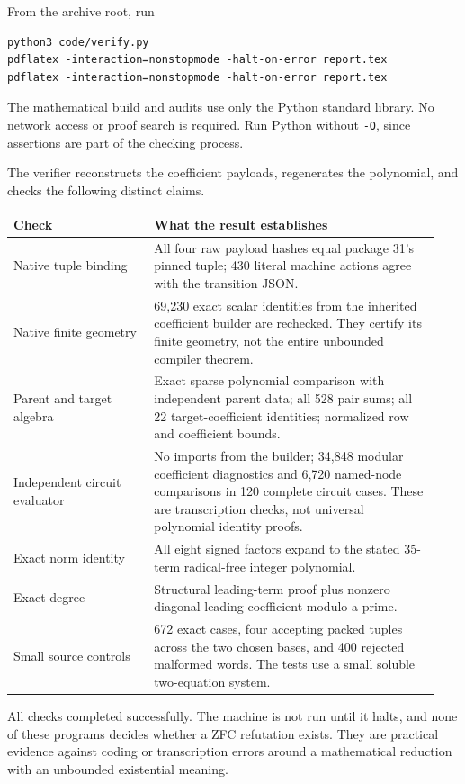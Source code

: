 \documentclass[11pt]{article}
\newcommand{\file}[1]{\nolinkurl{#1}}
\theoremstyle{definition}
\theoremstyle{remark}
\numberwithin{equation}{section}
\begin{document}
From the archive root, run
\begin{verbatim}
python3 code/verify.py
pdflatex -interaction=nonstopmode -halt-on-error report.tex
pdflatex -interaction=nonstopmode -halt-on-error report.tex
\end{verbatim}
The mathematical build and audits use only the Python standard library.
No network access or proof search is required. Run Python without
\file{-O}, since assertions are part of the checking process.

The verifier reconstructs the coefficient payloads, regenerates the
polynomial, and checks the following distinct claims.

\begin{longtable}{@{}p{0.31\linewidth}p{0.63\linewidth}@{}}
\toprule
Check & What the result establishes\\
\midrule
\endhead
Native tuple binding &
All four raw payload hashes equal package 31's pinned tuple; 430 literal
machine actions agree with the transition JSON.\\[4pt]
Native finite geometry &
69,230 exact scalar identities from the inherited coefficient builder
are rechecked. They certify its finite geometry, not the entire
unbounded compiler theorem.\\[4pt]
Parent and target algebra &
Exact sparse polynomial comparison with independent parent data; all
528 pair sums; all 22 target-coefficient identities; normalized row and
coefficient bounds.\\[4pt]
Independent circuit evaluator &
No imports from the builder; 34,848 modular coefficient diagnostics and
6,720 named-node comparisons in 120 complete circuit cases. These are
transcription checks, not universal polynomial identity proofs.\\[4pt]
Exact norm identity &
All eight signed factors expand to the stated 35-term radical-free
integer polynomial.\\[4pt]
Exact degree &
Structural leading-term proof plus nonzero diagonal leading
coefficient modulo a prime.\\[4pt]
Small source controls &
672 exact cases, four accepting packed tuples across the two chosen
bases, and 400 rejected malformed words. The tests use a small soluble
two-equation system.\\
\bottomrule
\end{longtable}

All checks completed successfully. The machine is not run until it
halts, and none of these programs decides whether a ZFC refutation
exists. They are practical evidence against coding or transcription
errors around a mathematical reduction with an unbounded existential
meaning.
\end{document}
